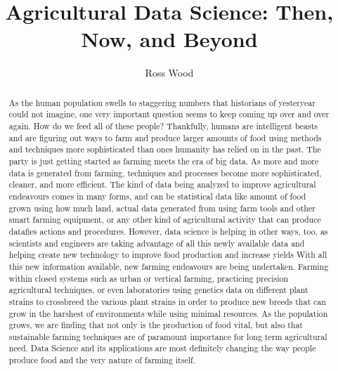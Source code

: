 \documentclass[sigconf]{acmart}
\begin{document}
\title{Agricultural Data Science: Then, Now, and Beyond}


\author{Ross Wood}

\begin{abstract}

As the human population swells to staggering numbers that historians of yesteryear could not imagine, one very important question seems to keep coming up over and over again. How do we feed all of these people? Thankfully, humans are intelligent beasts and are figuring out ways to farm and produce larger amounts of food using methods and techniques more sophisticated than ones humanity has relied on in the past. The party is just getting started as farming meets the era of big data. As more and more data is generated from farming, techniques and processes become more sophisticated, cleaner, and more efficient. The kind of data being analyzed to improve agricultural endeavours comes in many forms, and can be statistical data like amount of food grown using how much land, actual data generated from using farm tools and other smart farming equipment, or any other kind of agricultural activity that can produce datafies actions and procedures. However, data science is helping in other ways, too, as scientists and engineers are taking advantage of all this newly available data and helping create new technology to improve food production and increase yields  With all this new information available, new farming endeavours are being undertaken. Farming within closed systems such as urban or vertical farming, practicing precision agricultural techniques, or even laboratories using genetics data on different plant strains to crossbreed the various plant strains in order to produce new breeds that can grow in the harshest of environments while using minimal resources. As the population grows, we are finding that not only is the production of food vital, but also that sustainable farming techniques are of paramount importance for long term agricultural need. Data Science and its applications are most definitely changing the way people produce food and the very nature of farming itself.

\end{abstract}


\maketitle
\end{document}
